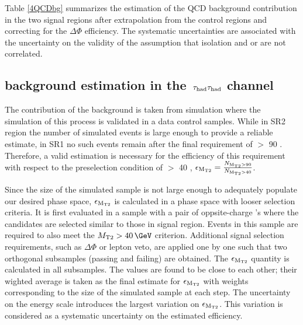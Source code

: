 Table \ref{4QCDbg} 
summarizes the estimation of the QCD background contribution in the two signal regions after extrapolation from the control regions and 
correcting for the $\Delta \Phi$ efficiency.  
The systematic uncertainties are associated with the uncertainty on the validity 
of the assumption that isolation and \mttwo or \SumMT are not correlated.


\subsection{\texorpdfstring{\wjets background estimation in the $\,\tau_{\rm had}\tau_{\rm had}$ channel}{Wjets background estimation in the tau-tau channel}}
The contribution of the \wjets background is taken from simulation where the simulation of this process is validated in a data control samples. 
While in SR2 region the number of simulated \wjets events is large enough to provide a reliable estimate, in SR1 no such events remain after the final requirement of \mttwo $>$ 90 \GeV. Therefore, a valid estimation is necessary for the efficiency of this requirement with respect to the preselection condition of \mttwo $>$ 40 \GeV, $\epsilon_{\rm M_{T2}}=\frac{N_{\rm M_{T2}>90}}{N_{\rm M_{T2}>40}}$. 

Since the size of the simulated \wjets sample is not large enough to adequately populate our desired phase space, $\epsilon_{\rm M_{T2}}$ is calculated in a phase space with looser selection criteria. It is first evaluated in a \wjets sample with a pair of oppsite-charge \Tau's where the \Tau candidates are selected similar to those in signal region. Events in this sample are required to also meet the $\mttwo>40\,\GeV$ criterion. Additional signal selection requirements, such as $\Delta \Phi$ or lepton veto, are applied one by one such that two orthogonal subsamples (passing and failing) are obtained. The $\epsilon_{\rm M_{T2}}$ quantity is calculated in all subsamples. The values are found to be close to each other; their wighted average is taken as the final estimate for $\epsilon_{\rm M_{T2}}$ with weights corresponding to the size of the simulated sample at each step. The uncertainty on the \Tau energy scale introduces the largest variation on $\epsilon_{\rm M_{T2}}$. This variation is considered as a systematic uncertainty on the estimated efficiency.

